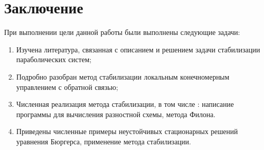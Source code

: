 \section{Заключение}
\vspace{1em}
При выполнении цели данной работы были выполнены следующие задачи:
\begin{enumerate}
	\item Изучена литература, связанная с описанием и решением задачи стабилизации параболических систем;
	\item Подробно разобран метод стабилизации локальным конечномерным управлением с обратной связью;
	\item Численная реализация метода стабилизации, в том числе : написание программы для вычисления разностной схемы, метода Филона.
	\item Приведены численные примеры неустойчивых стационарных решений уравнения Бюргерса, применение метода стабилизации.
\end{enumerate}
